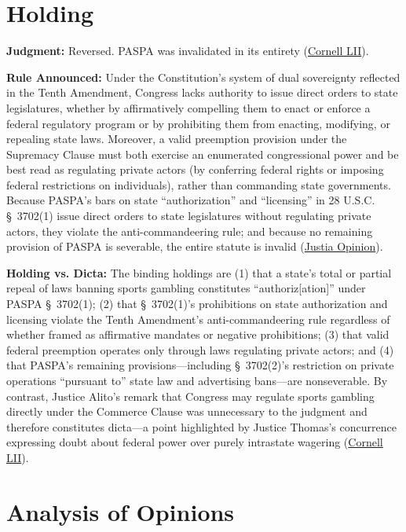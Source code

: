 \documentclass[12pt]{article}
\begin{document}
\section{Holding}

\textbf{Judgment:} Reversed. PASPA was invalidated in its entirety (\href{https://www.law.cornell.edu/supremecourt/text/16-476}{Cornell LII}).

\textbf{Rule Announced:} Under the Constitution's system of dual sovereignty reflected in the Tenth Amendment, Congress lacks authority to issue direct orders to state legislatures, whether by affirmatively compelling them to enact or enforce a federal regulatory program or by prohibiting them from enacting, modifying, or repealing state laws. Moreover, a valid preemption provision under the Supremacy Clause must both exercise an enumerated congressional power and be best read as regulating private actors (by conferring federal rights or imposing federal restrictions on individuals), rather than commanding state governments. Because PASPA's bars on state ``authorization'' and ``licensing'' in 28 U.S.C. \S~3702(1) issue direct orders to state legislatures without regulating private actors, they violate the anti-commandeering rule; and because no remaining provision of PASPA is severable, the entire statute is invalid (\href{https://supreme.justia.com/cases/federal/us/584/16-476/}{Justia Opinion}).

\textbf{Holding vs. Dicta:} The binding holdings are (1) that a state's total or partial repeal of laws banning sports gambling constitutes ``authoriz[ation]'' under PASPA \S~3702(1); (2) that \S~3702(1)'s prohibitions on state authorization and licensing violate the Tenth Amendment's anti-commandeering rule regardless of whether framed as affirmative mandates or negative prohibitions; (3) that valid federal preemption operates only through laws regulating private actors; and (4) that PASPA's remaining provisions---including \S~3702(2)'s restriction on private operations ``pursuant to'' state law and advertising bans---are nonseverable. By contrast, Justice Alito's remark that Congress may regulate sports gambling directly under the Commerce Clause was unnecessary to the judgment and therefore constitutes dicta---a point highlighted by Justice Thomas's concurrence expressing doubt about federal power over purely intrastate wagering (\href{https://www.law.cornell.edu/supremecourt/text/16-476}{Cornell LII}).

\section{Analysis of Opinions}
\end{document}
